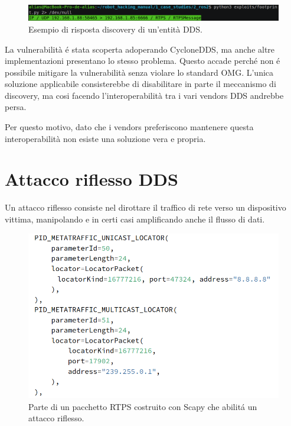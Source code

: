 \begin{figure}[H]
    \centering
    \includegraphics[width=15.2cm, keepaspectratio]{img/rispostarecoinnassance.png}
    \caption{Esempio di risposta discovery di un'entità DDS.}
    \label{rispostarecoinnassance}
\end{figure}

La vulnerabilità é stata scoperta adoperando 
CycloneDDS, ma anche altre implementazioni 
presentano lo stesso problema. 
Questo accade perché non é possibile mitigare 
la vulnerabilità senza violare lo standard 
OMG. L'unica soluzione applicabile consisterebbe 
di disabilitare in parte il meccanismo di discovery, 
ma cosi facendo l'interoperabilità tra i vari vendors 
DDS andrebbe persa. 

Per questo motivo, dato che i vendors 
preferiscono mantenere questa interoperabilità non esiste 
una soluzione vera e propria.


\section{Attacco riflesso DDS}
Un attacco riflesso consiste nel dirottare il traffico 
di rete verso un dispositivo vittima, manipolando e in certi 
casi amplificando anche il flusso di dati.

\begin{figure}[H]
    \centering
    \includegraphics[width=15.2cm, keepaspectratio]{img/submessaggereflection.png}
    \caption{Parte di un pacchetto RTPS costruito con Scapy
    che abilitá un attacco
    riflesso.}
    \label{submessaggereflection}
\end{figure}

